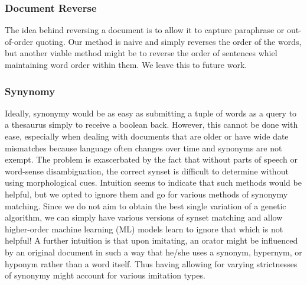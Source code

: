 
\subsubsection{Document Reverse}
The idea behind reversing a document is to allow it to capture paraphrase or out-of-order quoting. Our method is naive and simply reverses the order of the words, but another viable method might be to reverse the order of sentences whiel maintaining word order within them. We leave this to future work. 



\subsubsection{Synynomy}
Ideally, synonymy would be as easy as submitting a tuple of words as a query to a thesaurus simply to receive a boolean back. However, this cannot be done with ease, especially when dealing with documents that are older or have wide date mismatches because language often changes over time and synonyms are not exempt. The problem is exascerbated by the fact that without parts of speech or word-sense disambiguation, the correct synset is difficult to determine without using morphological cues. Intuition seems to indicate that such methods would be helpful, but we opted to ignore them and go for various methods of synonymy matching. Since we do not aim to obtain the best single variation of a genetic algorithm, we can simply have various versions of synset matching and allow higher-order machine learning (ML) models learn to ignore that which is not helpful! A further intuition is that upon imitating, an orator might be influenced by an original document in such a way that he/she uses a synonym, hypernym, or hyponym rather than a word itself. Thus having allowing for varying strictnesses of synonymy might account for various imitation types.

